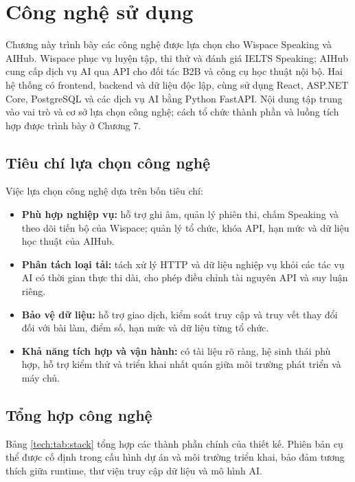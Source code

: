 
\section{Công nghệ sử dụng}
\label{sec:technologies}

Chương này trình bày các công nghệ được lựa chọn cho Wispace Speaking và AIHub. Wispace phục vụ luyện tập, thi thử và đánh giá IELTS Speaking; AIHub cung cấp dịch vụ AI qua API cho đối tác B2B và công cụ học thuật nội bộ. Hai hệ thống có frontend, backend và dữ liệu độc lập, cùng sử dụng React, ASP.NET Core, PostgreSQL và các dịch vụ AI bằng Python FastAPI. Nội dung tập trung vào vai trò và cơ sở lựa chọn công nghệ; cách tổ chức thành phần và luồng tích hợp được trình bày ở Chương 7.

\subsection{Tiêu chí lựa chọn công nghệ}

Việc lựa chọn công nghệ dựa trên bốn tiêu chí:
\begin{itemize}
    \item \textbf{Phù hợp nghiệp vụ:} hỗ trợ ghi âm, quản lý phiên thi, chấm Speaking và theo dõi tiến bộ của Wispace; quản lý tổ chức, khóa API, hạn mức và dữ liệu học thuật của AIHub.
    \item \textbf{Phân tách loại tải:} tách xử lý HTTP và dữ liệu nghiệp vụ khỏi các tác vụ AI có thời gian thực thi dài, cho phép điều chỉnh tài nguyên API và suy luận riêng.
    \item \textbf{Bảo vệ dữ liệu:} hỗ trợ giao dịch, kiểm soát truy cập và truy vết thay đổi đối với bài làm, điểm số, hạn mức và dữ liệu từng tổ chức.
    \item \textbf{Khả năng tích hợp và vận hành:} có tài liệu rõ ràng, hệ sinh thái phù hợp, hỗ trợ kiểm thử và triển khai nhất quán giữa môi trường phát triển và máy chủ.
\end{itemize}

\subsection{Tổng hợp công nghệ}

Bảng \ref{tech:tab:stack} tổng hợp các thành phần chính của thiết kế. Phiên bản cụ thể được cố định trong cấu hình dự án và môi trường triển khai, bảo đảm tương thích giữa runtime, thư viện truy cập dữ liệu và mô hình AI.

